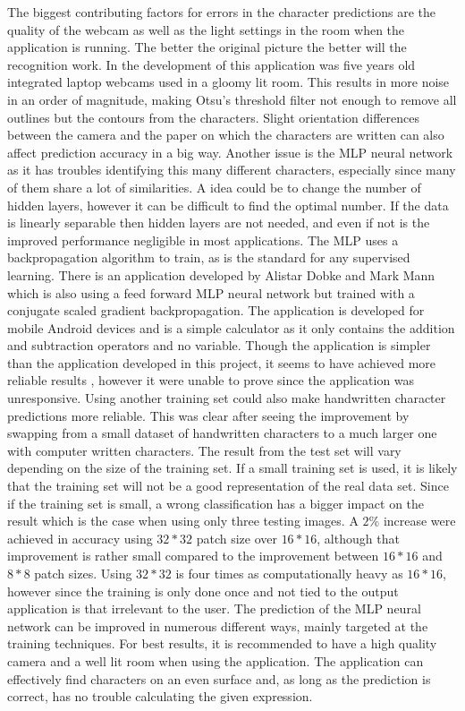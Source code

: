\documentclass[12pt]{report}
\begin{document}
The biggest contributing factors for errors in the character predictions are the quality of the webcam as well as the light settings in the room when the application is running. The better the original picture the better will the recognition work. In the development of this application was five years old integrated laptop webcams used in a gloomy lit room. This results in more noise in an order of magnitude, making Otsu’s threshold filter not enough to remove all outlines but the contours from the characters. Slight orientation differences between the camera and the paper on which the characters are written can also affect prediction accuracy in a big way. Another issue is the MLP neural network as it has troubles identifying this many different characters, especially since many of them share a lot of similarities. A idea could be to change the number of hidden layers, however it can be difficult to find the optimal number. If the data is linearly separable then hidden layers are not needed, and even if not is the improved performance negligible in most applications. 
\newline
\newline
The MLP uses a backpropagation algorithm to train, as is the standard for any supervised learning. There is an application developed by Alistar Dobke and Mark Mann which is also using a feed forward MLP neural network but trained with a conjugate scaled gradient backpropagation. The application is developed for mobile Android devices and is a simple calculator as it only contains the addition and subtraction operators and no variable. Though the application is simpler than the application developed in this project, it seems to have achieved more reliable results \cite{app}, however it were unable to prove since the application was unresponsive. Using another training set could also make handwritten character predictions more reliable. This was clear after seeing the improvement by swapping from a small dataset of handwritten characters to a much larger one with computer written characters. The result from the test set will vary depending on the size of the training set. If a small training set is used, it is likely that the training set will not be a good representation of the real data set. Since if the training set is small, a wrong classification has a bigger impact on the result which is the case when using only three testing images. A $2\%$ increase were achieved in accuracy using $32*32$ patch size over $16*16$, although that improvement is rather small compared to the improvement between $16*16$ and $8*8$ patch sizes. Using $32*32$ is four times as computationally heavy as $16*16$, however since the training is only done once and not tied to the output application is that irrelevant to the user. 
\newline
\newline
The prediction of the MLP neural network can be improved in numerous different ways, mainly targeted at the training techniques. For best results, it is recommended to have a high quality camera and a well lit room when using the application. The application can effectively find characters on an even surface and, as long as the prediction is correct, has no trouble calculating the given expression.
\end{document}
